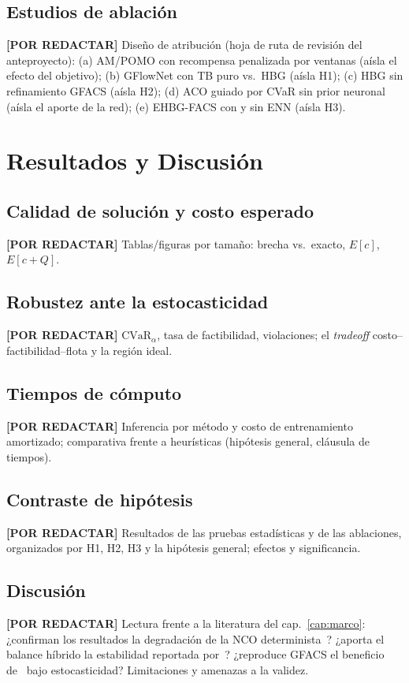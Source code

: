 \documentclass[12pt]{report}
\newcommand{\pendiente}[1]{\par\noindent\colorbox{lightbg}{%
  \begin{minipage}{0.94\linewidth}\small
  \textcolor{uanlgold}{\textbf{[POR REDACTAR]}} #1
  \end{minipage}}\par\medskip}
\begin{document}
\section{Estudios de ablaci\'on}\label{sec:ablaciones}
\pendiente{Dise\~no de atribuci\'on (hoja de ruta de revisi\'on del
anteproyecto): (a) AM/POMO con recompensa penalizada por ventanas (a\'isla el
efecto del objetivo); (b) GFlowNet con TB puro vs.\ HBG (a\'isla H1); (c)
HBG sin refinamiento GFACS (a\'isla H2); (d) ACO guiado por CVaR sin prior
neuronal (a\'isla el aporte de la red); (e) EHBG-FACS con y sin ENN (a\'isla
H3).}

\chapter{Resultados y Discusi\'on}\label{cap:resultados}

\section{Calidad de soluci\'on y costo esperado}\label{sec:res-costo}
\pendiente{Tablas/figuras por tama\~no: brecha vs.\ exacto, $E[c]$, $E[c+Q]$.}

\section{Robustez ante la estocasticidad}\label{sec:res-robustez}
\pendiente{$\mathrm{CVaR}_\alpha$, tasa de factibilidad, violaciones; el
\emph{tradeoff} costo--factibilidad--flota y la regi\'on ideal.}

\section{Tiempos de c\'omputo}\label{sec:res-tiempos}
\pendiente{Inferencia por m\'etodo y costo de entrenamiento amortizado;
comparativa frente a heur\'isticas (hip\'otesis general, cl\'ausula de
tiempos).}

\section{Contraste de hip\'otesis}\label{sec:res-hipotesis}
\pendiente{Resultados de las pruebas estad\'isticas y de las ablaciones,
organizados por H1, H2, H3 y la hip\'otesis general; efectos y significancia.}

\section{Discusi\'on}\label{sec:discusion}
\pendiente{Lectura frente a la literatura del cap.~\ref{cap:marco}: ¿confirman
los resultados la degradaci\'on de la NCO determinista~\cite{Heakl2025SVRP}?
¿aporta el balance h\'ibrido la estabilidad reportada por~\cite{Zhang2025Hybrid}?
¿reproduce GFACS el beneficio de~\cite{Kim2024GFACS} bajo estocasticidad?
Limitaciones y amenazas a la validez.}
\end{document}

